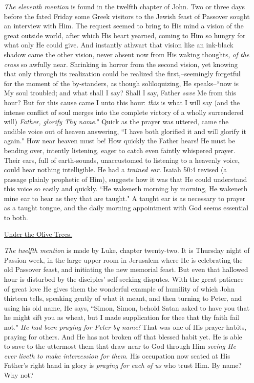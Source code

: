 \textit{The eleventh mention} is found in the twelfth chapter of John. Two or
three days before the fated Friday some Greek visitors to the Jewish feast
of Passover sought an interview with Him. The request seemed to bring to
His mind a vision of the great outside world, after which His heart
yearned, coming to Him so hungry for what only He could give. And
instantly athwart that vision like an ink-black shadow came the other
vision, never absent now from His waking thoughts, \textit{of the cross} so
awfully near. Shrinking in horror from the second vision, yet knowing that
only through its realization could be realized the first,--seemingly
forgetful for the moment of the by-standers, as though soliloquizing, He
speaks--``now is My soul troubled; and what shall I say? Shall I say,
Father \textit{save} Me from this hour? But for this cause came I unto this hour:
\textit{this} is what I will say (and the intense conflict of soul merges into
the complete victory of a wholly surrendered will) \textit{Father, glorify Thy
name}." Quick as the prayer was uttered, came the audible voice out of
heaven answering, ``I have both glorified it and will glorify it again."
How near heaven must be! How quickly the Father hears! He must be bending
over, intently listening, eager to catch even faintly whispered prayer.
Their ears, full of earth-sounds, unaccustomed to listening to a heavenly
voice, could hear nothing intelligible. He had a \textit{trained ear}. Isaiah
50:4 revised (a passage plainly prophetic of Him), suggests how it was
that He could understand this voice so easily and quickly. ``He wakeneth
morning by morning, He wakeneth mine ear to hear as they that are taught."
A taught ear is as necessary to prayer as a taught tongue, and the daily
morning appointment with God seems essential to both.



\underline{Under the Olive Trees.}


\textit{The twelfth mention} is made by Luke, chapter twenty-two. It is Thursday
night of Passion week, in the large upper room in Jerusalem where He is
celebrating the old Passover feast, and initiating the new memorial feast.
But even that hallowed hour is disturbed by the disciples' self-seeking
disputes. With the great patience of great love He gives them the
wonderful example of humility of which John thirteen tells, speaking
gently of what it meant, and then turning to Peter, and using his old
name, He says, ``Simon, Simon, behold Satan asked to have you that he might
sift you as wheat, but I made supplication for thee that thy faith fail
not." \textit{He had been praying for Peter by name!} That was one of His
prayer-habits, praying for others. And He has not broken off that blessed
habit yet. He is able to save to the uttermost them that draw near to God
through Him \textit{seeing He ever liveth to make intercession for them}. His
occupation now seated at His Father's right hand in glory is \textit{praying for
each of us} who trust Him. By name? Why not?

